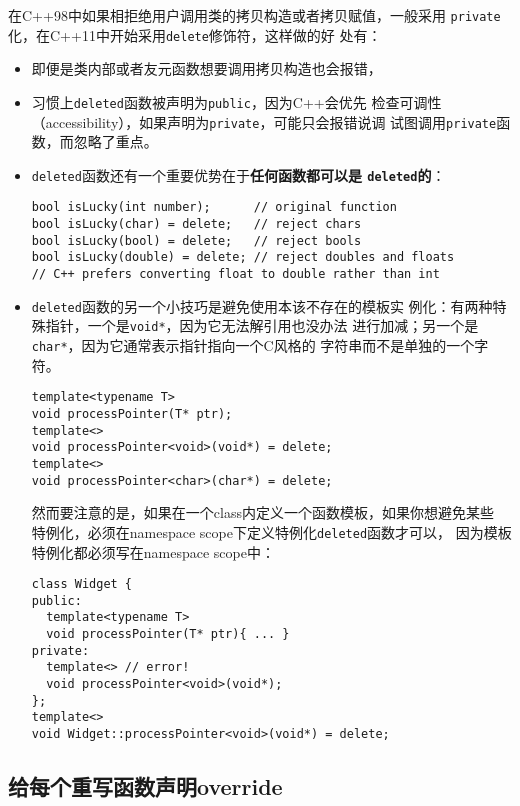 在C++98中如果相拒绝用户调用类的拷贝构造或者拷贝赋值，一般采用
\texttt{private}化，在C++11中开始采用\texttt{delete}修饰符，这样做的好
处有：
\begin{itemize}
\item 即便是类内部或者友元函数想要调用拷贝构造也会报错，
\item 习惯上\texttt{deleted}函数被声明为\texttt{public}，因为C++会优先
  检查可调性（accessibility），如果声明为\texttt{private}，可能只会报错说调
 试图调用\texttt{private}函数，而忽略了重点。
\item \texttt{deleted}函数还有一个重要优势在于\textbf{任何函数都可以是
    \texttt{deleted}的}：
\begin{verbatim}
bool isLucky(int number);      // original function
bool isLucky(char) = delete;   // reject chars
bool isLucky(bool) = delete;   // reject bools
bool isLucky(double) = delete; // reject doubles and floats
// C++ prefers converting float to double rather than int
\end{verbatim}
\item  \texttt{deleted}函数的另一个小技巧是避免使用本该不存在的模板实
  例化：有两种特殊指针，一个是\texttt{void*}，因为它无法解引用也没办法
  进行加减；另一个是\texttt{char*}，因为它通常表示指针指向一个C风格的
  字符串而不是单独的一个字符。
\begin{verbatim}
template<typename T>
void processPointer(T* ptr);
template<>
void processPointer<void>(void*) = delete;
template<>
void processPointer<char>(char*) = delete;
\end{verbatim}
  然而要注意的是，如果在一个class内定义一个函数模板，如果你想避免某些
  特例化，必须在namespace scope下定义特例化\texttt{deleted}函数才可以，
  因为模板特例化都必须写在namespace scope中：
\begin{verbatim}
class Widget {
public:
  template<typename T>
  void processPointer(T* ptr){ ... }
private:
  template<> // error!
  void processPointer<void>(void*);
};
template<> 
void Widget::processPointer<void>(void*) = delete;
\end{verbatim}
\end{itemize}


\subsection{给每个重写函数声明override}
\label{sec:Item2-12}

